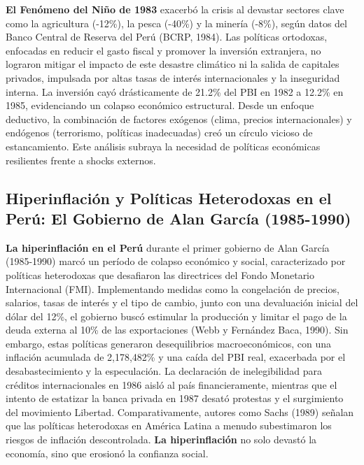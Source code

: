 \documentclass[
  jou,
  floatsintext,
  longtable,
  a4paper,
  nolmodern,
  notxfonts,
  notimes,
  colorlinks=true,linkcolor=blue,citecolor=blue,urlcolor=blue]{apa7}
\begin{document}
\textbf{El Fenómeno del Niño de 1983} exacerbó la crisis al devastar
sectores clave como la agricultura (-12\%), la pesca (-40\%) y la
minería (-8\%), según datos del Banco Central de Reserva del Perú (BCRP,
1984). Las políticas ortodoxas, enfocadas en reducir el gasto fiscal y
promover la inversión extranjera, no lograron mitigar el impacto de este
desastre climático ni la salida de capitales privados, impulsada por
altas tasas de interés internacionales y la inseguridad interna. La
inversión cayó drásticamente de 21.2\% del PBI en 1982 a 12.2\% en 1985,
evidenciando un colapso económico estructural. Desde un enfoque
deductivo, la combinación de factores exógenos (clima, precios
internacionales) y endógenos (terrorismo, políticas inadecuadas) creó un
círculo vicioso de estancamiento. Este análisis subraya la necesidad de
políticas económicas resilientes frente a shocks externos.

\subsection{Hiperinflación y Políticas Heterodoxas en el Perú: El
Gobierno de Alan García
(1985-1990)}\label{hiperinflaciuxf3n-y-poluxedticas-heterodoxas-en-el-peruxfa-el-gobierno-de-alan-garcuxeda-1985-1990}

\textbf{La hiperinflación en el Perú} durante el primer gobierno de Alan
García (1985-1990) marcó un período de colapso económico y social,
caracterizado por políticas heterodoxas que desafiaron las directrices
del Fondo Monetario Internacional (FMI). Implementando medidas como la
congelación de precios, salarios, tasas de interés y el tipo de cambio,
junto con una devaluación inicial del dólar del 12\%, el gobierno buscó
estimular la producción y limitar el pago de la deuda externa al 10\% de
las exportaciones (Webb y Fernández Baca, 1990). Sin embargo, estas
políticas generaron desequilibrios macroeconómicos, con una inflación
acumulada de 2,178,482\% y una caída del PBI real, exacerbada por el
desabastecimiento y la especulación. La declaración de inelegibilidad
para créditos internacionales en 1986 aisló al país financieramente,
mientras que el intento de estatizar la banca privada en 1987 desató
protestas y el surgimiento del movimiento Libertad. Comparativamente,
autores como Sachs (1989) señalan que las políticas heterodoxas en
América Latina a menudo subestimaron los riesgos de inflación
descontrolada. \textbf{La hiperinflación} no solo devastó la economía,
sino que erosionó la confianza social.
\end{document}
